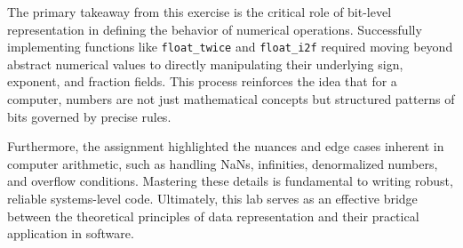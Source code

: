 \documentclass{article}
\begin{document}
The primary takeaway from this exercise is the critical role of bit-level 
representation in defining the behavior of numerical operations. Successfully 
implementing functions like \texttt{float\_twice} and \texttt{float\_i2f} 
required moving beyond abstract numerical values to directly manipulating their 
underlying sign, exponent, and fraction fields. This process reinforces the idea 
that for a computer, numbers are not just mathematical concepts but structured 
patterns of bits governed by precise rules.

Furthermore, the assignment highlighted the nuances and edge cases inherent in 
computer arithmetic, such as handling NaNs, infinities, denormalized numbers, 
and overflow conditions. Mastering these details is fundamental to writing 
robust, reliable systems-level code. Ultimately, this lab serves as an effective 
bridge between the theoretical principles of data representation and their 
practical application in software.
\end{document}

